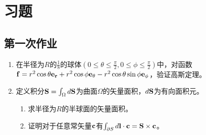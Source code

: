 \documentclass[12pt,a4paper]{ctexart}
\numberwithin{equation}{subsection}
\begin{document}
\section{习题}
\subsection{第一次作业}
\begin{enumerate}
    \item 在半径为$R$的$\frac{1}{8}$的球体$(0\leqslant\theta\leqslant\frac{\pi}{2},0\leqslant\phi\leqslant\frac{\pi}{2})$中，对函数$\vb{f}=r^2\cos\theta\vb{e_r}+r^2\cos\phi\vb{e_\theta}-r^2\cos\theta\sin\phi\vb{e_\phi}$，验证高斯定理。
    \item 定义积分$\vb{S}=\int_\Omega d\vb{S}$为曲面$\Omega$的矢量面积，$d\vb{S}$为有向面积元。\\
    \begin{enumerate}
        \item 求半径为$R$的半球面的矢量面积。
        \item 证明对于任意常矢量$\vb{c}$有$\int_{\partial S} d\vb{l}\cdot\vb{c}=\vb{S}\times\vb{c}$。
    \end{enumerate}
\end{enumerate}

    
\end{document}
